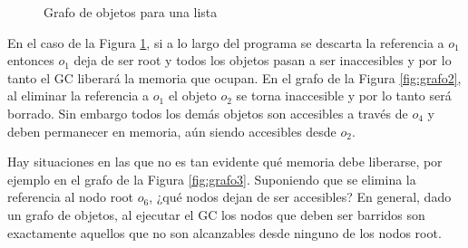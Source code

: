 \begin{figure}
\begin{center}
\end{center}
\caption{Grafo de objetos para una lista}
\label{fig:grafo1}
\end{figure}

En el caso de la Figura \ref{fig:grafo1}, si a lo largo del programa se descarta la referencia a $o_1$ entonces $o_1$ deja de ser root y todos los objetos pasan a ser inaccesibles y por lo tanto el GC liberará la memoria que ocupan. En el grafo de la Figura \ref{fig:grafo2}, al eliminar la referencia a $o_1$ el objeto $o_2$ se torna inaccesible y por lo tanto será borrado. Sin embargo todos los demás objetos son accesibles a través de $o_4$ y deben permanecer en memoria, aún siendo accesibles desde $o_2$.

Hay situaciones en las que no es tan evidente qué memoria debe liberarse, por ejemplo en el grafo de la Figura \ref{fig:grafo3}. Suponiendo que se elimina la referencia al nodo root $o_6$, ¿qué nodos dejan de ser accesibles? En general, dado un grafo de objetos, al ejecutar el GC los nodos que deben ser barridos son exactamente aquellos que no son alcanzables desde ninguno de los nodos root. 

